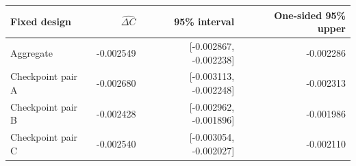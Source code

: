 \begin{tabular}{lrrr}
\toprule
Fixed design & $\widehat{\Delta C}$ & 95\% interval & One-sided 95\% upper \\
\midrule
Aggregate & -0.002549 & [-0.002867, -0.002238] & -0.002286 \\
Checkpoint pair A & -0.002680 & [-0.003113, -0.002248] & -0.002313 \\
Checkpoint pair B & -0.002428 & [-0.002962, -0.001896] & -0.001986 \\
Checkpoint pair C & -0.002540 & [-0.003054, -0.002027] & -0.002110 \\
\bottomrule
\end{tabular}
